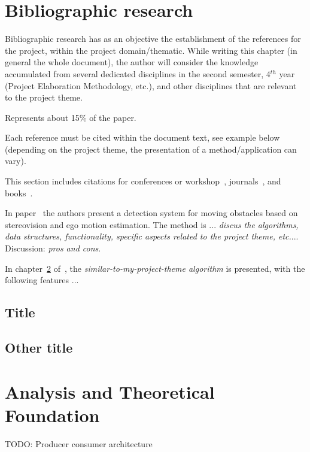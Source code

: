 \documentclass[12pt,a4paper,twoside]{report}
\begin{document}
\newpage

\listoffigures
\tableofcontents
\newpage







\chapter{Bibliographic research}


Bibliographic research has as an objective the establishment of the references for the project, within the project domain/thematic. While writing this chapter (in general the whole document), the author will consider the knowledge accumulated from several dedicated disciplines in the second semester, 4$^{th}$ year (Project Elaboration Methodology, etc.), and other disciplines that are relevant to the project theme.

Represents about 15\% of the paper.

Each reference must be cited within the document text, see example below (depending on the project theme, the presentation of a method/application can vary).


This section includes citations for conferences or workshop~\cite{BellucciLZ04}, journals~\cite{AntoniouSBDB07}, 
and books~\cite{russell1995artificial}. 

In paper~\cite{AntoniouSBDB07} the authors present a detection system for moving obstacles based on stereovision and ego motion estimation. 
The method is ... {\it discus the algorithms, data structures, functionality, specific aspects related to the project theme, etc.}... Discussion: {\it pros and cons}.

In chapter~\ref{ch:analysis} of~\cite{strunk}, the {\it similar-to-my-project-theme algorithm} is presented, with the following features ...


\section{Title}
\section{Other title}


\chapter{Analysis and Theoretical Foundation}
\label{ch:analysis}
TODO: Producer consumer architecture
\end{document}
